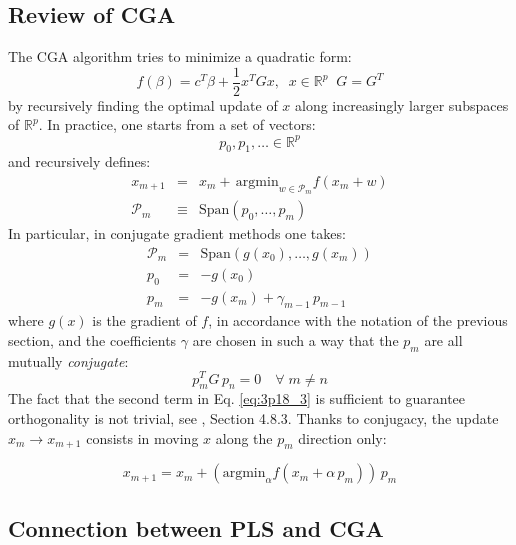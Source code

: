 \subsection*{Review of CGA}

The CGA algorithm tries to minimize a quadratic form:
\begin{equation*}
f(\beta) = c^T \beta + \frac{1}{2} x^T G x, \;\;x \in \mathbb{R}^p\;\; G = G^T
\end{equation*}
by recursively finding the optimal update of $x$ along
increasingly larger subspaces of $\mathbb{R}^p$. In practice,
one starts from a set of vectors:
$$
p_0, p_1, \ldots \in \mathbb{R}^p
$$
and recursively defines:
\begin{eqnarray*}
    x_{m + 1} & = & x_{m} + \,
    \textrm{argmin}_{w \in \mathcal{P}_{m}} f(x_{m} + w) \\
    \mathcal{P}_{m} & \equiv & \textrm{Span} \left(p_0, \ldots, p_m\right)    
\end{eqnarray*}
In particular, in conjugate gradient methods one takes:
\begin{eqnarray}
    \mathcal{P}_{m} & = & \textrm{Span} \left(g(x_0), \ldots, g(x_m)\right) \\
    p_0 & = & - g(x_0) \\ \label{eq:3p18_3}
    p_m & = & - g(x_m) + \gamma_{m - 1}\, p_{m - 1}
\end{eqnarray}
where $g(x)$ is the gradient of $f$, in accordance with
the notation of the previous section, and the coefficients $\gamma$ are chosen
in such a way that the $p_m$ are all mutually \textit{conjugate}:
\begin{equation*}
p_m^T G\,p_n = 0 \quad \forall \; m \neq n
\end{equation*}
The fact that the second term in Eq. \ref{eq:3p18_3} is 
sufficient to guarantee orthogonality is not trivial,
see \cite{Murray1982}, Section 4.8.3. Thanks to conjugacy,
the update $x_m \rightarrow x_{m + 1}$ consists in moving $x$
along the $p_m$ direction only:

\begin{equation}\label{eq:e3p18_update}
x_{m + 1} = x_m + \left(\textrm{argmin}_\alpha 
    f(x_m + \alpha \, p_{m})\right)\, p_m
\end{equation}

\subsection*{Connection between PLS and CGA}

